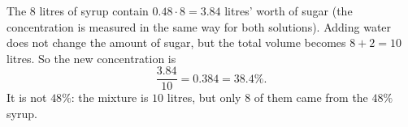The $8$ litres of syrup contain $0.48\cdot8=3.84$ litres' worth of sugar (the concentration is measured in the same way for both solutions). Adding water does not change the amount of sugar, but the total volume becomes $8+2=10$ litres. So the new concentration is
\[
\dfrac{3.84}{10}=0.384=\boxed{38.4\%}.
\]
It is not $48\%$: the mixture is $10$ litres, but only $8$ of them came from the $48\%$ syrup.
